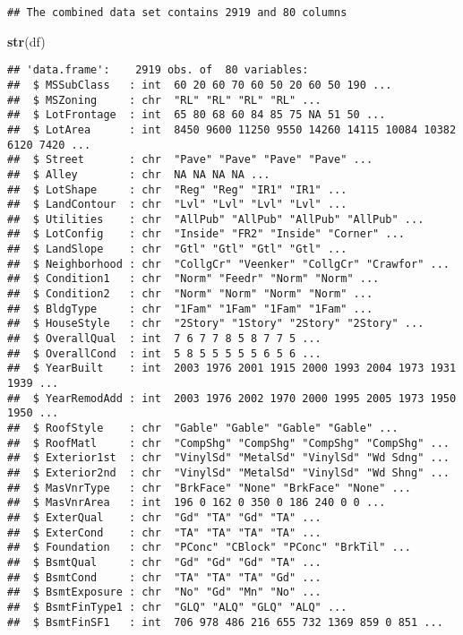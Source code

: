 \documentclass[]{article}
\newenvironment{Shaded}{\begin{snugshade}}{\end{snugshade}}
\newcommand{\KeywordTok}[1]{\textcolor[rgb]{0.13,0.29,0.53}{\textbf{#1}}}
\newcommand{\NormalTok}[1]{#1}
\begin{document}
\begin{verbatim}
## The combined data set contains 2919 and 80 columns
\end{verbatim}

\begin{Shaded}
\begin{Highlighting}[]
\KeywordTok{str}\NormalTok{(df)}
\end{Highlighting}
\end{Shaded}

\begin{verbatim}
## 'data.frame':    2919 obs. of  80 variables:
##  $ MSSubClass   : int  60 20 60 70 60 50 20 60 50 190 ...
##  $ MSZoning     : chr  "RL" "RL" "RL" "RL" ...
##  $ LotFrontage  : int  65 80 68 60 84 85 75 NA 51 50 ...
##  $ LotArea      : int  8450 9600 11250 9550 14260 14115 10084 10382 6120 7420 ...
##  $ Street       : chr  "Pave" "Pave" "Pave" "Pave" ...
##  $ Alley        : chr  NA NA NA NA ...
##  $ LotShape     : chr  "Reg" "Reg" "IR1" "IR1" ...
##  $ LandContour  : chr  "Lvl" "Lvl" "Lvl" "Lvl" ...
##  $ Utilities    : chr  "AllPub" "AllPub" "AllPub" "AllPub" ...
##  $ LotConfig    : chr  "Inside" "FR2" "Inside" "Corner" ...
##  $ LandSlope    : chr  "Gtl" "Gtl" "Gtl" "Gtl" ...
##  $ Neighborhood : chr  "CollgCr" "Veenker" "CollgCr" "Crawfor" ...
##  $ Condition1   : chr  "Norm" "Feedr" "Norm" "Norm" ...
##  $ Condition2   : chr  "Norm" "Norm" "Norm" "Norm" ...
##  $ BldgType     : chr  "1Fam" "1Fam" "1Fam" "1Fam" ...
##  $ HouseStyle   : chr  "2Story" "1Story" "2Story" "2Story" ...
##  $ OverallQual  : int  7 6 7 7 8 5 8 7 7 5 ...
##  $ OverallCond  : int  5 8 5 5 5 5 5 6 5 6 ...
##  $ YearBuilt    : int  2003 1976 2001 1915 2000 1993 2004 1973 1931 1939 ...
##  $ YearRemodAdd : int  2003 1976 2002 1970 2000 1995 2005 1973 1950 1950 ...
##  $ RoofStyle    : chr  "Gable" "Gable" "Gable" "Gable" ...
##  $ RoofMatl     : chr  "CompShg" "CompShg" "CompShg" "CompShg" ...
##  $ Exterior1st  : chr  "VinylSd" "MetalSd" "VinylSd" "Wd Sdng" ...
##  $ Exterior2nd  : chr  "VinylSd" "MetalSd" "VinylSd" "Wd Shng" ...
##  $ MasVnrType   : chr  "BrkFace" "None" "BrkFace" "None" ...
##  $ MasVnrArea   : int  196 0 162 0 350 0 186 240 0 0 ...
##  $ ExterQual    : chr  "Gd" "TA" "Gd" "TA" ...
##  $ ExterCond    : chr  "TA" "TA" "TA" "TA" ...
##  $ Foundation   : chr  "PConc" "CBlock" "PConc" "BrkTil" ...
##  $ BsmtQual     : chr  "Gd" "Gd" "Gd" "TA" ...
##  $ BsmtCond     : chr  "TA" "TA" "TA" "Gd" ...
##  $ BsmtExposure : chr  "No" "Gd" "Mn" "No" ...
##  $ BsmtFinType1 : chr  "GLQ" "ALQ" "GLQ" "ALQ" ...
##  $ BsmtFinSF1   : int  706 978 486 216 655 732 1369 859 0 851 ...

\end{verbatim}
\end{document}
